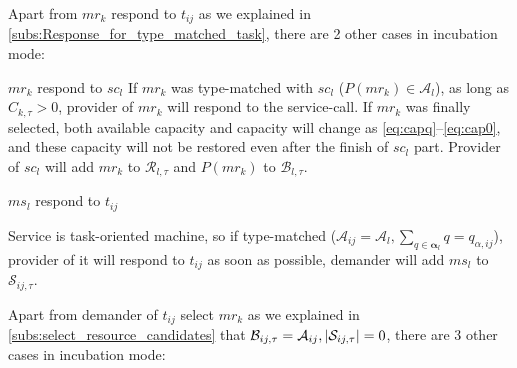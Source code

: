 Apart from $mr_k$ respond to $t_{ij}$ as we explained in \autoref{subs:Response_for_type_matched_task}, there are 2 other cases in incubation mode:
\begin{asparaenum}
\item $mr_k$ respond to $sc_l$
If $mr_k$ was type-matched with $sc_l$ ($P(mr_k)\in\mathcal{A}_l$), as long as $C_{k,\tau}> 0$, provider of $mr_k$ will respond to the service-call. If $mr_k$ was finally selected, both available capacity and capacity will change as \autoref{eq:capq}--\ref{eq:cap0}, and these capacity will not be restored even after the finish of $sc_l$ part. Provider of $sc_l$ will add $mr_k$ to $\mathcal{R}_{l,\tau}$ and $P(mr_k)$ to $\mathcal{B}_{l,\tau}$.
\item $ms_l$ respond to $t_{ij}$
\end{asparaenum}
Service is task-oriented machine, so if type-matched ($\mathcal{A}_{ij} =\mathcal{A}_l,\sum_{q\in\bm{\alpha}_l} q = q_{\alpha,ij}$), provider of it will respond to $t_{ij}$ as soon as possible, demander will add $ms_l$ to $\mathcal{S}_{ij,\tau}$.


Apart from demander of $t_{ij}$ select $mr_k$ as we explained in \autoref{subs:select_resource_candidates} that $\mathcal{B}_{ij,\tau} = \mathcal{A}_{ij},\left|\mathcal{S}_{ij,\tau}\right|=0$, there are 3 other cases in incubation mode:

